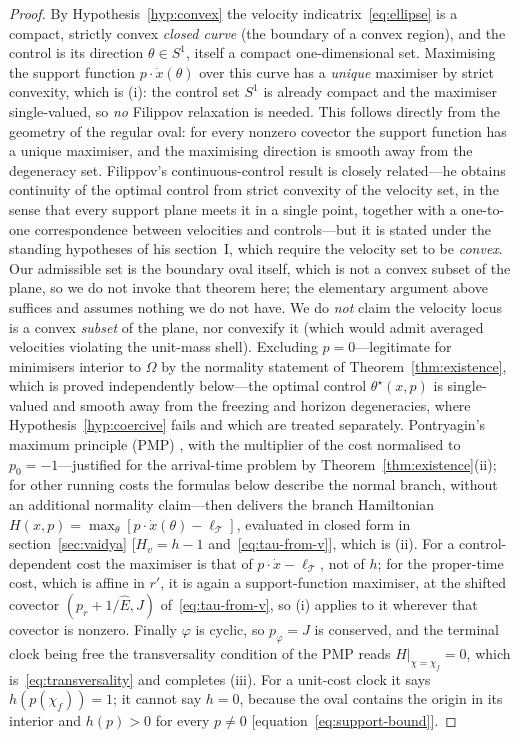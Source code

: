 \documentclass[12pt]{iopart}
\newcommand{\Ehat}{\hat E}
\theoremstyle{plain}
\theoremstyle{definition}
\theoremstyle{plain}
\theoremstyle{remark}
\begin{document}
\begin{proof}
By Hypothesis~\ref{hyp:convex} the velocity indicatrix~\eqref{eq:ellipse} is a compact,
strictly convex \emph{closed curve} (the boundary of a convex region), and the control is
its direction $\theta\in S^1$, itself a compact one-dimensional set. Maximising the
support function $p\cdot\dot x(\theta)$ over this curve has a \emph{unique} maximiser by
strict convexity, which is (i): the control set $S^1$ is already compact and the maximiser
single-valued, so \emph{no} Filippov relaxation is needed. This follows directly from
the geometry of the regular oval: for every nonzero covector the support function has
a unique maximiser, and the maximising direction is smooth away from the degeneracy
set. Filippov's continuous-control result \cite[\S III]{Filippov1962} is closely
related---he obtains continuity of the optimal control from strict convexity of the
velocity set, in the sense that every support plane meets it in a single point,
together with a one-to-one correspondence between velocities and controls---but it is
stated under the standing hypotheses of his section~I, which require the velocity set
to be \emph{convex}. Our admissible set is the boundary oval itself, which is not a
convex subset of the plane, so we do not invoke that theorem here; the elementary
argument above suffices and assumes nothing we do not have. We do \emph{not} claim the
velocity locus is a convex \emph{subset} of the plane, nor convexify it (which would admit
averaged velocities violating the unit-mass shell). Excluding $p=0$---legitimate for minimisers interior to $\Omega$ by the
normality statement of Theorem~\ref{thm:existence}, which is proved independently
below---the optimal control $\theta^\star(x,p)$ is single-valued and smooth away from the
freezing and horizon degeneracies, where Hypothesis~\ref{hyp:coercive} fails and which are
treated separately. Pontryagin's maximum principle (PMP) \cite{Pontryagin,Liberzon},
with the multiplier of the cost normalised to $p_0=-1$---justified for the arrival-time
problem by Theorem~\ref{thm:existence}(ii); for other running costs the formulas below
describe the normal branch, without an additional normality claim---then delivers the
branch Hamiltonian
$H(x,p)=\max_\theta[p\cdot\dot x(\theta)-\ell_{\mathcal T}]$, evaluated in closed form in
section~\ref{sec:vaidya} [$H_v=h-1$ and~\eqref{eq:tau-from-v}], which is (ii). For a
control-dependent cost the maximiser is that of $p\cdot\dot x-\ell_{\mathcal T}$, not of
$h$; for the proper-time cost, which is affine in $r'$, it is again a support-function
maximiser, at the shifted covector $(p_r+1/\Ehat,J)$ of~\eqref{eq:tau-from-v}, so (i) applies to it wherever that covector is nonzero.
Finally $\varphi$ is cyclic, so
$p_\varphi=J$ is conserved, and the terminal clock being free the
transversality condition of the PMP reads $H|_{\chi=\chi_f}=0$, which
is~\eqref{eq:transversality} and completes (iii). For a unit-cost clock it says
$h(p(\chi_f))=1$; it cannot say $h=0$, because the oval contains the origin in its
interior and $h(p)>0$ for every $p\neq0$ [equation~\eqref{eq:support-bound}].
\end{proof}
\end{document}
